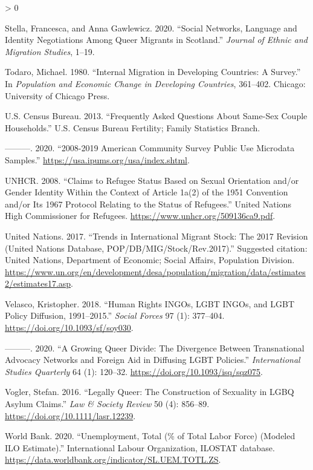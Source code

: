 \documentclass[
  11pt,
]{article}
\newlength{\cslhangindent}
\newenvironment{CSLReferences}[2] %
 {%
  \setlength{\parindent}{0pt}
  \ifodd #1 \everypar{\setlength{\hangindent}{\cslhangindent}}\ignorespaces\fi
  \ifnum #2 > 0
  \setlength{\parskip}{#2\baselineskip}
  \fi
 }%
 {}
\begin{document}
\begin{CSLReferences}{1}{0}
\leavevmode\hypertarget{ref-stella_2020}{}%
Stella, Francesca, and Anna Gawlewicz. 2020. {``Social Networks, Language and Identity Negotiations Among Queer Migrants in {Scotland}.''} \emph{Journal of Ethnic and Migration Studies}, 1--19.

\leavevmode\hypertarget{ref-todaro_1980}{}%
Todaro, Michael. 1980. {``Internal Migration in Developing Countries: A Survey.''} In \emph{Population and Economic Change in Developing Countries}, 361--402. Chicago: University of Chicago Press.

\leavevmode\hypertarget{ref-u.s.censusbureau_2013}{}%
U.S. Census Bureau. 2013. {``Frequently {Asked} {Questions} {About} {Same}-{Sex} {Couple} {Households}.''} U.S. Census Bureau Fertility; Family Statistics Branch.

\leavevmode\hypertarget{ref-u.s.censusbureau_2020}{}%
---------. 2020. {``2008-2019 {American} {Community} {Survey} {Public} {Use} {Microdata} {Samples}.''} \url{https://usa.ipums.org/usa/index.shtml}.

\leavevmode\hypertarget{ref-unhcr_2008}{}%
UNHCR. 2008. {``Claims to {Refugee} {Status} Based on {Sexual} {Orientation} and/or {Gender} {Identity} Within the Context of {Article} {1a}(2) of the 1951 {Convention} and/or Its 1967 {Protocol} Relating to the {Status} of {Refugees}.''} United Nations High Commissioner for Refugees. \url{https://www.unhcr.org/509136ca9.pdf}.

\leavevmode\hypertarget{ref-unitednations_2017}{}%
United Nations. 2017. {``Trends in {International} {Migrant} {Stock}: {The} 2017 {Revision} ({United} {Nations} Database, {POP}/{DB}/{MIG}/{Stock}/{Rev}.2017).''} Suggested citation: United Nations, Department of Economic; Social Affairs, Population Division. \url{https://www.un.org/en/development/desa/population/migration/data/estimates2/estimates17.asp}.

\leavevmode\hypertarget{ref-velasco_2018}{}%
Velasco, Kristopher. 2018. {``Human {Rights} {INGOs}, {LGBT} {INGOs}, and {LGBT} {Policy} {Diffusion}, 1991--2015.''} \emph{Social Forces} 97 (1): 377--404. \url{https://doi.org/10.1093/sf/soy030}.

\leavevmode\hypertarget{ref-velasco_2020}{}%
---------. 2020. {``A {Growing} {Queer} {Divide}: {The} {Divergence} Between {Transnational} {Advocacy} {Networks} and {Foreign} {Aid} in {Diffusing} {LGBT} {Policies}.''} \emph{International Studies Quarterly} 64 (1): 120--32. \url{https://doi.org/10.1093/isq/sqz075}.

\leavevmode\hypertarget{ref-vogler_2016}{}%
Vogler, Stefan. 2016. {``Legally {Queer}: {The} {Construction} of {Sexuality} in {LGBQ} {Asylum} {Claims}.''} \emph{Law \& Society Review} 50 (4): 856--89. \url{https://doi.org/10.1111/lasr.12239}.

\leavevmode\hypertarget{ref-worldbank_2020}{}%
World Bank. 2020. {``Unemployment, Total (\% of Total Labor Force) (Modeled {ILO} Estimate).''} International Labour Organization, ILOSTAT database. \url{https://data.worldbank.org/indicator/SL.UEM.TOTL.ZS}.

\end{CSLReferences}
\end{document}
